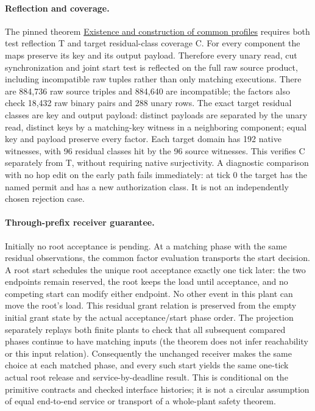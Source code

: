 \documentclass{article}
\begin{document}
\paragraph{Reflection and coverage.} The pinned theorem \href{https://github.com/eternal-november/eos-research-programmes/blob/e1348964f73704212d2d8b48d5982a5ed600a2ff/projects/contextual-composition/feedback-and-concurrency/observable-covers/Residual_Profiles_and_Admission_Reflection.tex}{Existence and construction of common profiles} requires both test reflection T and target residual-class coverage C. For every component the maps preserve its key and its output payload. Therefore every unary read, cut synchronization and joint start test is reflected on the full raw source product, including incompatible raw tuples rather than only matching executions. There are 884,736 raw source triples and 884,640 are incompatible; the factors also check 18,432 raw binary pairs and 288 unary rows. The exact target residual classes are key and output payload: distinct payloads are separated by the unary read, distinct keys by a matching-key witness in a neighboring component; equal key and payload preserve every factor. Each target domain has 192 native witnesses, with 96 residual classes hit by the 96 source witnesses. This verifies C separately from T, without requiring native surjectivity. A diagnostic comparison with no hop edit on the early path fails immediately: at tick 0 the target has the named permit and has a new authorization class. It is not an independently chosen rejection case.

\paragraph{Through-prefix receiver guarantee.} Initially no root acceptance is pending. At a matching phase with the same residual observations, the common factor evaluation transports the start decision. A root start schedules the unique root acceptance exactly one tick later: the two endpoints remain reserved, the root keeps the load until acceptance, and no competing start can modify either endpoint. No other event in this plant can move the root's load. This residual grant relation is preserved from the empty initial grant state by the actual acceptance/start phase order. The projection separately replays both finite plants to check that all subsequent compared phases continue to have matching inputs (the theorem does not infer reachability or this input relation). Consequently the unchanged receiver makes the same choice at each matched phase, and every such start yields the same one-tick actual root release and service-by-deadline result. This is conditional on the primitive contracts and checked interface histories; it is not a circular assumption of equal end-to-end service or transport of a whole-plant safety theorem.
\end{document}
